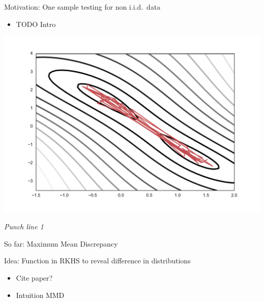 


\begin{frame}
\begin{columns}
\begin{column}{.33\linewidth}
\vspace{-0.75cm}
\begin{block}{Motivation: One sample testing for non i.i.d.\ data}
\begin{minipage}{.57\linewidth}
\begin{itemize}
\item TODO Intro
\end{itemize}
\end{minipage}
\begin{minipage}{.37\linewidth}
\includegraphics[scale=0.8]{img/sgld_trace_and_density.pdf}
\end{minipage}
\vspace{1cm}
\begin{center}
\emph{Punch line 1}
\end{center}
\end{block}
\vspace{-0.75cm}
\begin{block}{So far: Maximum Mean Discrepancy}
\begin{center}Idea: Function in RKHS to reveal difference in distributions\end{center}
\begin{minipage}{.60\linewidth}
\begin{itemize}
\item Cite paper?
\item Intuition MMD
\end{itemize}
\end{minipage}

\end{block}
\end{column}
\end{columns}
\end{frame}
